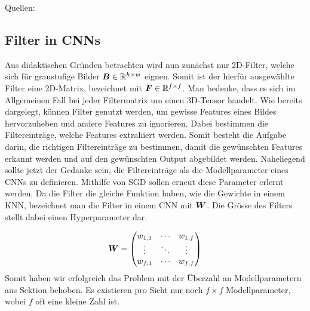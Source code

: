 \para{}
Quellen: \cite{deeplearning.ai:cnn} \cite{wiki:kernel} \cite{net:gimp_conv}


\subsection{Filter in CNNs}
Aus didaktischen Gründen betrachten wird nun zunächst
nur 2D-Filter, welche sich für graustufige Bilder
$\bm{B} \in \mathbb{R}^{h \times w}$ eignen. Somit ist der hierfür ausgewählte
Filter eine 2D-Matrix, bezeichnet mit $\bm{F} \in \mathbb{R}^{f \times
  f}$. Man bedenke, dass es sich im Allgemeinen Fall bei jeder Filtermatrix
um einen 3D-Tensor handelt.
\para{}
Wie bereits dargelegt, können Filter genutzt werden, um gewisse
Features eines Bildes hervorzuheben und andere Features zu ignorieren. Dabei
bestimmen die Filtereinträge, welche Features extrahiert werden. Somit besteht
die Aufgabe darin, die richtigen Filtereinträge zu bestimmen, damit die
gewünschten Features erkannt werden und auf den gewünschten Output abgebildet
werden. Naheliegend sollte jetzt der Gedanke sein, die Filtereinträge als die
Modellparameter eines CNNs zu definieren.
Mithilfe von SGD sollen erneut diese Parameter
erlernt werden.
\para{}
Da die Filter die gleiche Funktion haben, wie die Gewichte in einem KNN,
bezeichnet man die Filter in einem CNN mit $\bm{W}$. Die Grösse des Filters
stellt dabei einen Hyperparameter dar.

\begin{equation*}
  \bm{W} = \begin{pmatrix}
    w_{1,1} & \cdots & w_{1,f} \\
    \vdots & \ddots & \vdots \\
    w_{f,1} & \cdots & w_{f,f}
  \end{pmatrix}
\end{equation*}
Somit haben wir erfolgreich das Problem mit der Überzahl an Modellparametern aus
Sektion  behoben. Es existieren pro Sicht nur noch $f \times f$
Modellparameter, wobei $f$ oft eine kleine Zahl ist.


